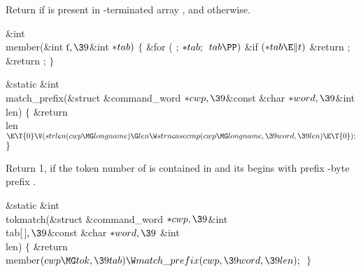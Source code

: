 Return  if  is present in -terminated array %
, and
 otherwise.

\Y\B\&{int} \\{member}(\&{int} \|t${},\39{}$\&{int} ${}{*}\\{tab}){}$\1\1\2\2\6
${}\{{}$\1\6
\&{for} ( ; ${}{*}\\{tab};{}$ ${}\\{tab}\PP){}$\1\6
\&{if} ${}({*}\\{tab}\E\|t){}$\1\5
\&{return} ;\2\2\6
\&{return} ;\6
\4${}\}{}$\2\par
\fi

\Y\B\&{static} \&{int} \\{match\_prefix}(\&{struct} \&{command\_word} ${}{*}%
\\{cwp},\39{}$\&{const} \&{char} ${}{*}\\{word},\39{}$\&{int} \\{len})\1\1\2\2\6
${}\{{}$\1\6
\&{return} \\{len}${}\E\T{0}\V(\\{strlen}(\\{cwp}\MG\\{longname})\G\\{len}\W%
\\{strncasecmp}(\\{cwp}\MG\\{longname},\39\\{word},\39\\{len})\E\T{0});{}$\6
\4${}\}{}$\2\par
\fi

Return 1, if the token number of  is contained in  and its
 begins with prefix -byte prefix .

\Y\B\&{static} \&{int} \\{tokmatch}(\&{struct} \&{command\_word} ${}{*}\\{cwp},%
\39{}$\&{int} \\{tab}[\,]${},\39{}$\&{const} \&{char} ${}{*}\\{word},\39{}$%
\&{int} \\{len})\1\1\2\2\6
${}\{{}$\1\6
\&{return} \\{member}${}(\\{cwp}\MG\\{tok},\39\\{tab})\W\\{match\_prefix}(%
\\{cwp},\39\\{word},\39\\{len});{}$\6
\4${}\}{}$\2\par
\fi

